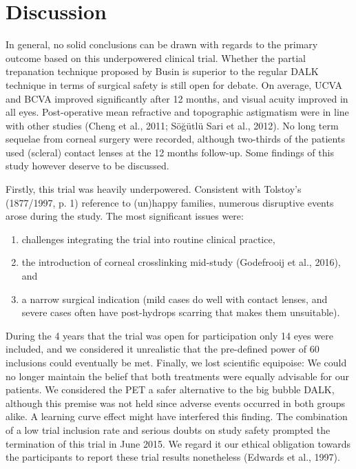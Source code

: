 \documentclass[authordate, empirical]{jote-new-article}
\begin{document}
	\section{Discussion}



	In general, no solid conclusions can be drawn with regards to the primary outcome based on this underpowered clinical trial. Whether the partial trepanation technique proposed by Busin is superior to the regular DALK technique in terms of surgical safety is still open for debate. On average, UCVA and BCVA improved significantly after 12 months, and visual acuity improved in all eyes. Post-operative mean refractive and topographic astigmatism were in line with other studies (Cheng et al., 2011; Söğütlü Sari et al., 2012). No long term sequelae from corneal surgery were recorded, although two-thirds of the patients used (scleral) contact lenses at the 12 months follow-up. Some findings of this study however deserve to be discussed.



	Firstly, this trial was heavily underpowered. Consistent with Tolstoy's (1877/1997, p. 1) reference to (un)happy families, numerous disruptive events arose during the study. The most significant issues were:

	\begin{enumerate}


		\item challenges integrating the trial into routine clinical practice,



		\item
		the introduction of corneal crosslinking mid-study (Godefrooij et al., 2016), and



		\item a narrow surgical indication (mild cases do well with contact lenses, and severe cases often have post-hydrops scarring that makes them unsuitable).


	\end{enumerate}

	During the 4 years that the trial was open for participation only 14 eyes were included, and we considered it unrealistic that the pre-defined power of 60 inclusions could eventually be met. Finally, we lost scientific equipoise: We could no longer maintain the belief that both treatments were equally advisable for our patients. We considered the PET a safer alternative to the big bubble DALK, although this premise was not held since adverse events occurred in both groups alike. A learning curve effect might have interfered this finding. The combination of a low trial inclusion rate and serious doubts on study safety prompted the termination of this trial in June 2015. We regard it our ethical obligation towards the participants to report these trial results nonetheless (Edwards et al., 1997).
\end{document}
